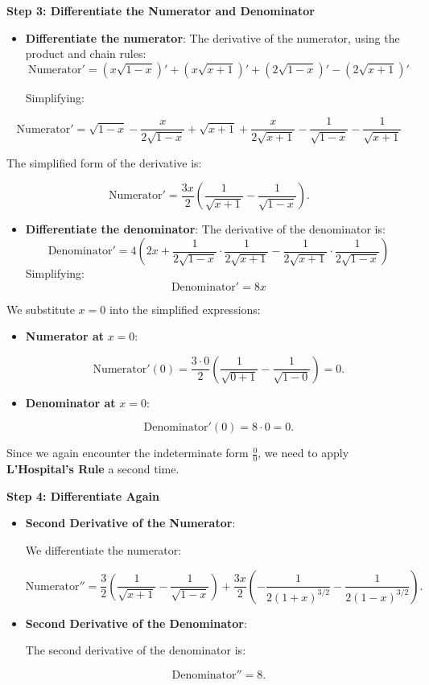 \documentclass[
]{book}
\providecommand{\tightlist}{%
  \setlength{\itemsep}{0pt}\setlength{\parskip}{0pt}}
\theoremstyle{definition}
\theoremstyle{definition}
\theoremstyle{definition}
\theoremstyle{definition}
\theoremstyle{remark}
\begin{document}
\textbf{Step 3: Differentiate the Numerator and Denominator}

\begin{itemize}
\item
  \textbf{Differentiate the numerator}: The derivative of the numerator, using the product and chain rules: \[
    \text{Numerator}' = \left( x \sqrt{1 - x} \right)' + \left( x \sqrt{x + 1} \right)' + \left( 2 \sqrt{1 - x} \right)' - \left( 2 \sqrt{x + 1} \right)'
    \]

  Simplifying:
\end{itemize}

\[
    \text{Numerator}' = \sqrt{1 - x} - \frac{x}{2\sqrt{1 - x}} + \sqrt{x + 1} + \frac{x}{2\sqrt{x + 1}} - \frac{1}{\sqrt{1 - x}} - \frac{1}{\sqrt{x + 1}}
\]

The simplified form of the derivative is:

\[
\text{Numerator}' = \frac{3x}{2} \left( \frac{1}{\sqrt{x + 1}} - \frac{1}{\sqrt{1 - x}} \right).
\]

\begin{itemize}
\tightlist
\item
  \textbf{Differentiate the denominator}: The derivative of the denominator is: \[
    \text{Denominator}' = 4 \left( 2x + \frac{1}{2\sqrt{1 - x}} \cdot \frac{1}{2\sqrt{x + 1}} - \frac{1}{2\sqrt{x + 1}} \cdot \frac{1}{2\sqrt{1 - x}} \right)
    \] Simplifying: \[
    \text{Denominator}' = 8x
    \]
\end{itemize}

We substitute \(x = 0\) into the simplified expressions:

\begin{itemize}
\item
  \textbf{Numerator at} \(x = 0\):

  \[
    \text{Numerator}'(0) = \frac{3 \cdot 0}{2} \left( \frac{1}{\sqrt{0 + 1}} - \frac{1}{\sqrt{1 - 0}} \right) = 0.
  \]
\item
  \textbf{Denominator at} \(x = 0\):

  \[
    \text{Denominator}'(0) = 8 \cdot 0 = 0.
  \]
\end{itemize}

Since we again encounter the indeterminate form \(\frac{0}{0}\), we need to apply \textbf{L'Hospital's Rule} a second time.

\textbf{Step 4: Differentiate Again}

\begin{itemize}
\item
  \textbf{Second Derivative of the Numerator}:

  We differentiate the numerator:

  \[
    \text{Numerator}'' = \frac{3}{2} \left( \frac{1}{\sqrt{x + 1}} - \frac{1}{\sqrt{1 - x}} \right) + \frac{3x}{2} \left( -\frac{1}{2(1 + x)^{3/2}} - \frac{1}{2(1 - x)^{3/2}} \right).
    \]
\item
  \textbf{Second Derivative of the Denominator}:

  The second derivative of the denominator is:

  \[
    \text{Denominator}'' = 8.
    \]
\end{itemize}
\end{document}
